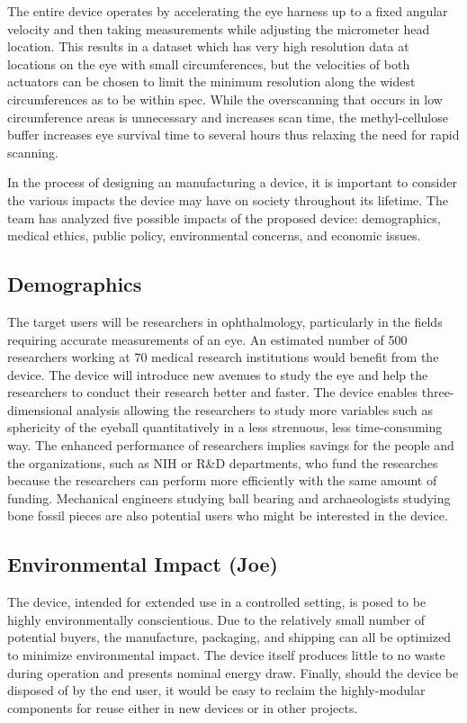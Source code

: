 \documentclass{article}
\begin{document}
The entire device operates by accelerating the eye harness up to a fixed angular velocity and then taking measurements while adjusting the micrometer head location. This results in a dataset which has very high resolution data at locations on the eye with small circumferences, but the velocities of both actuators can be chosen to limit the minimum resolution along the widest circumferences as to be within spec. While the overscanning that occurs in low circumference areas is unnecessary and increases scan time, the methyl-cellulose buffer increases eye survival time to several hours thus relaxing the need for rapid scanning.

In the process of designing an manufacturing a device, it is important to consider the various impacts the device may have on society throughout its lifetime. The team has analyzed five possible impacts of the proposed device: demographics, medical ethics, public policy, environmental concerns, and economic issues. 


\subsection{Demographics}
\label{sec:Demographics}

The target users will be researchers in ophthalmology,
particularly in the fields requiring accurate measurements of an
eye. An estimated number of 500 researchers working at 70 medical research institutions would
benefit from the device. The device will introduce new avenues to
study the eye and help the researchers to conduct their research
better and faster. The device enables three-dimensional analysis
allowing the researchers to study more variables such as sphericity of
the eyeball quantitatively in a less strenuous, less time-consuming
way. The enhanced performance of researchers implies savings for the
people and the organizations, such as NIH or R\&D departments, who
fund the researches because the researchers can perform more
efficiently with the same amount of funding. Mechanical engineers
studying ball bearing and archaeologists studying bone fossil pieces
are also potential users who might be interested in the device.
\subsection{Environmental Impact (Joe)}
\label{sec:environment}

The device, intended for extended use in a controlled setting, is
posed to be highly environmentally conscientious. Due to the
relatively small number of potential buyers, the manufacture,
packaging, and shipping can all be optimized to minimize environmental
impact. The device itself produces little to no waste during operation
and presents nominal energy draw. Finally, should the device be
disposed of by the end user, it would be easy to reclaim the
highly-modular components for reuse either in new devices or in other
projects.
\end{document}
